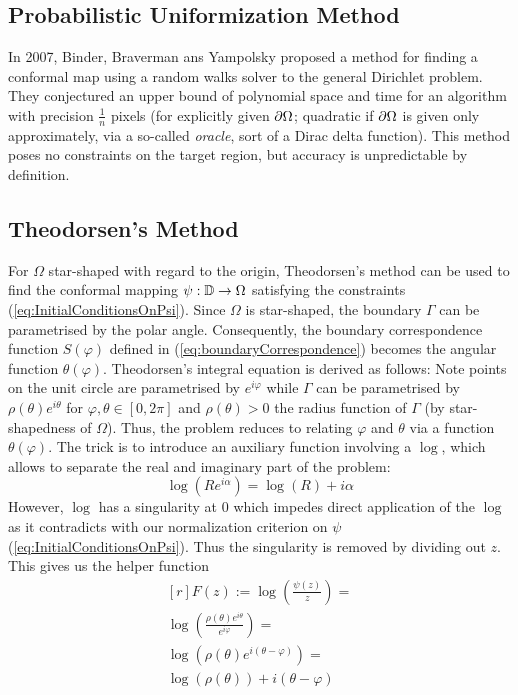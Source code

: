 \subsection{Probabilistic Uniformization Method} \label{chap:ProbabilisticMethod}
In 2007, Binder, Braverman ans Yampolsky \cite{binder2007_computationalcomplexityriemannmapping} proposed a method for finding a conformal map using a random walks solver to the general Dirichlet problem. They conjectured an upper bound of polynomial space and time for an algorithm with precision $\frac{1}{n}$ pixels (for explicitly given $\partial\Omega$; quadratic if $\partial\Omega$ is given only approximately, via a so-called \textit{oracle}, sort of a Dirac delta function). 
This method poses no constraints on the target region, but accuracy is unpredictable by definition.

\subsection{Theodorsen's Method} \label{chap:TheodorsenMethod}
For $\Omega$ star-shaped with regard to the origin, Theodorsen's method \cite[page 64]{Gaier1964} can be used to find the conformal mapping $\psi:\mathbb{D}\to\Omega$ satisfying the constraints (\ref{eq:InitialConditionsOnPsi}).
Since $\Omega$ is star-shaped, the boundary $\Gamma$ can be parametrised by the polar angle. 
Consequently, the boundary correspondence function $S(\varphi)$ defined in (\ref{eq:boundaryCorrespondence}) becomes the angular function $\theta(\varphi)$. 
Theodorsen's integral equation is derived as follows:
Note points on the unit circle are parametrised by $e^{i\varphi}$ while $\Gamma$ can be parametrised by $\rho(\theta)e^{i\theta}$ for $\varphi, \theta\in[0,2\pi]$ and $\rho(\theta)>0$ the radius function of $\Gamma$ (by star-shapedness of $\Omega$). 
Thus, the problem reduces to relating $\varphi$ and $\theta$ via a function $\theta(\varphi)$.
The trick is to introduce an auxiliary function involving a $\log$, which allows to separate the real and imaginary part of the problem: 
\begin{equation}
    \log(Re^{i\alpha}) = \log(R) + i\alpha
\end{equation} 
However, $\log$ has a singularity at $0$ which impedes direct application of the $\log$ as it contradicts with our normalization criterion on $\psi$ (\ref{eq:InitialConditionsOnPsi}).
Thus the singularity is removed by dividing out $z$. This gives us the helper function 
\begin{equation}\label{eq:helperfunctiontheodorsen}
    \begin{matrix*}[r]
        F(z) := \log(\frac{\psi(z)}{z}) = \\ 
        \log(\frac{\rho(\theta)e^{i\theta}}{e^{i\varphi}}) = \\
        \log(\rho(\theta)e^{i(\theta-\varphi)}) = \\
        \log(\rho(\theta))+i(\theta - \varphi)
    \end{matrix*}
\end{equation}
